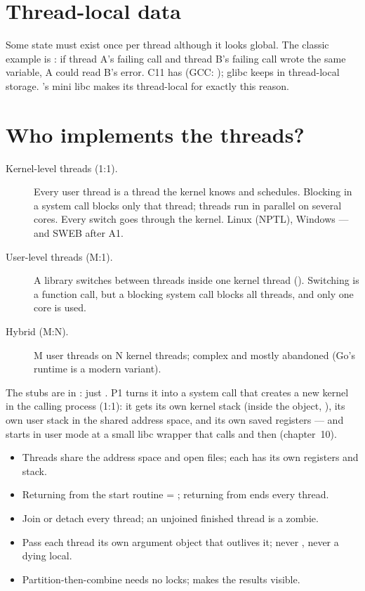 \section{Thread-local data}

Some state must exist once per thread although it looks global. The
classic example is : if thread A's failing call and thread
B's failing call wrote the same variable, A could read B's error. C11 has
 (GCC: ); glibc keeps 
in thread-local storage. 's mini libc makes its
 thread-local for exactly this reason.

\section{Who implements the threads?}

\begin{description}
  \item[Kernel-level threads (1:1).] Every user thread is a thread the
    kernel knows and schedules. Blocking in a system call blocks only that
    thread; threads run in parallel on several cores. Every switch goes
    through the kernel. Linux (NPTL), Windows --- and SWEB after A1.
  \item[User-level threads (M:1).] A library switches between threads
    inside one kernel thread (). Switching is a function call,
    but a blocking system call blocks all threads, and only one core is
    used.
  \item[Hybrid (M:N).] M user threads on N kernel threads; complex and
    mostly abandoned (Go's runtime is a modern variant).
\end{description}

\begin{swebbox}
The stubs are in :
 just . P1 turns it into a system
call that creates a new kernel  in the calling process
(1:1): it gets its own kernel stack (inside the  object,
), its own user stack in the shared address space,
and its own saved registers --- and starts in user mode at a small libc
wrapper that calls  and then
 (chapter~10).
\end{swebbox}

\begin{keybox}
\begin{itemize}
  \item Threads share the address space and open files; each has its own
    registers and stack.
  \item Returning from the start routine = ; returning
    from  ends every thread.
  \item Join or detach every thread; an unjoined finished thread is a
    zombie.
  \item Pass each thread its own argument object that outlives it; never
    , never a dying local.
  \item Partition-then-combine needs no locks;  makes the
    results visible.
\end{itemize}
\end{keybox}
